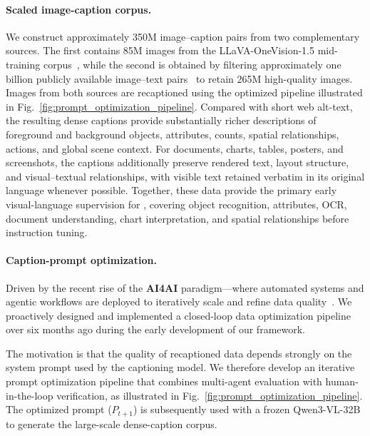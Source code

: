 \paragraph{Scaled image-caption corpus.}
We construct approximately 350M image--caption pairs from two complementary sources. The first contains 85M images from the LLaVA-OneVision-1.5 mid-training corpus~\citep{li2024llavaonevision15}, while the second is obtained by filtering approximately one billion publicly available image--text pairs~\citep{zhang2026mageflow} to retain 265M high-quality images. Images from both sources are recaptioned using the optimized pipeline illustrated in Fig.~\ref{fig:prompt_optimization_pipeline}. Compared with short web alt-text, the resulting dense captions provide substantially richer descriptions of foreground and background objects, attributes, counts, spatial relationships, actions, and global scene context. For documents, charts, tables, posters, and screenshots, the captions additionally preserve rendered text, layout structure, and visual--textual relationships, with visible text retained verbatim in its original language whenever possible. Together, these data provide the primary early visual-language supervision for \magevl, covering object recognition, attributes, OCR, document understanding, chart interpretation, and spatial relationships before instruction tuning.

\paragraph{Caption-prompt optimization.}
Driven by the recent rise of the \textbf{AI4AI} paradigm—where automated systems and agentic workflows are deployed to iteratively scale and refine data quality~\cite{ai4ai_scale2026}. We proactively designed and implemented a closed-loop data optimization pipeline over six months ago during the early development of our framework.

The motivation is that the quality of recaptioned data depends strongly on the system prompt used by the captioning model. We therefore develop an iterative prompt optimization pipeline that combines multi-agent evaluation with human-in-the-loop verification, as illustrated in Fig.~\ref{fig:prompt_optimization_pipeline}. The optimized prompt ($P_{t+1}$) is subsequently used with a frozen Qwen3-VL-32B \cite{qwen3vl} to generate the large-scale dense-caption corpus.




